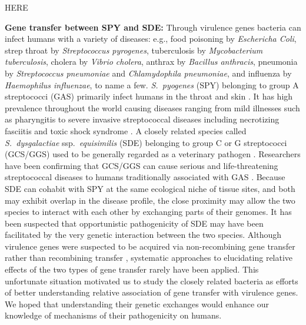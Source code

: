 \documentclass[english]{article}
\begin{document}
HERE

\textbf{Gene transfer between SPY and SDE:} Through virulence genes
bacteria can infect humans
with a variety of diseases: e.g., food poisoning by \emph{Eschericha
Coli}, strep throat by \emph{Streptococcus pyrogenes}, tuberculosis
by \emph{Mycobacterium tuberculosis}, cholera by \emph{Vibrio cholera},
anthrax by \emph{Bacillus anthracis}, pneumonia by \emph{Streptococcus
pneumoniae} and \emph{Chlamydophila pneumoniae}, and influenza by
\emph{Haemophilus influenzae}, to name a few. \emph{S.\ pyogenes}
(SPY) belonging to group A streptococci (GAS) primarily infect humans
in the throat and skin \citep{Broyles2009}. It has high prevalence
throughout the world causing diseases ranging from mild illnesses
such as pharyngitis to severe invasive streptococcal diseases including
necrotizing fasciitis and toxic shock syndrome \citep{Cunningham2000a}.
A closely related species called\emph{ S.\ dysgalactiae} ssp.\emph{\ 
equisimilis}
(SDE) belonging to group C or G streptococci (GCS/GGS) used to be
generally regarded as a veterinary pathogen \citep{Vandamme1996}.
Researchers have been confirming that GCS/GGS can cause serious and
life-threatening streptococcal diseases to humans traditionally associated
with GAS \citep[e.g.,][]{Brandt2009}. Because SDE can cohabit with
SPY at the same ecological niche of tissue sites, and both may exhibit
overlap in the disease profile, the close proximity
may allow the two species to interact with each other by exchanging
parts of their genomes. It has been suspected that opportunistic pathogenicity
of SDE may have been facilitated by the very genetic interaction between
the two species. 
Although virulence genes were suspected to be acquired via non-recombining gene
transfer rather than recombining transfer \citep{Groisman1994}, systematic
approaches to elucidating relative effects of the two types of gene transfer 
rarely have been applied. This unfortunate situation motivated us to study the
closely related bacteria as efforts of better understanding relative 
association of gene transfer with virulence genes.
We hoped that understanding their genetic exchanges
would enhance our knowledge of mechanisms of their pathogenicity on
humans. 
\end{document}
